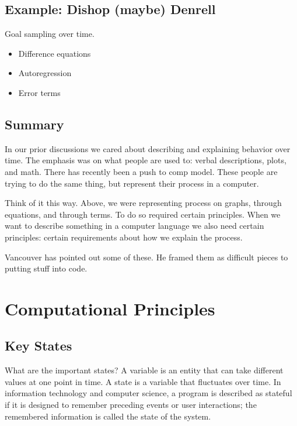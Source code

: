 \documentclass[english,,man]{apa6}
\providecommand{\tightlist}{%
  \setlength{\itemsep}{0pt}\setlength{\parskip}{0pt}}
\theoremstyle{definition}
\theoremstyle{definition}
\theoremstyle{definition}
\theoremstyle{remark}
\begin{document}
\hypertarget{example-dishop-maybe-denrell}{%
\subsection{Example: Dishop (maybe)
Denrell}\label{example-dishop-maybe-denrell}}

Goal sampling over time.

\begin{itemize}
\tightlist
\item
  Difference equations
\item
  Autoregression
\item
  Error terms
\end{itemize}

\hypertarget{summary-1}{%
\subsection{Summary}\label{summary-1}}

In our prior discussions we cared about describing and explaining
behavior over time. The emphasis was on what people are used to: verbal
descriptions, plots, and math. There has recently been a push to comp
model. These people are trying to do the same thing, but represent their
process in a computer.

Think of it this way. Above, we were representing process on graphs,
through equations, and through terms. To do so required certain
principles. When we want to describe something in a computer language we
also need certain principles: certain requirements about how we explain
the process.

Vancouver has pointed out some of these. He framed them as difficult
pieces to putting stuff into code.

\hypertarget{computational-principles}{%
\section{Computational Principles}\label{computational-principles}}

\hypertarget{key-states}{%
\subsection{Key States}\label{key-states}}

What are the important states? A variable is an entity that can take
different values at one point in time. A state is a variable that
fluctuates over time. In information technology and computer science, a
program is described as stateful if it is designed to remember preceding
events or user interactions; the remembered information is called the
state of the system.
\end{document}
